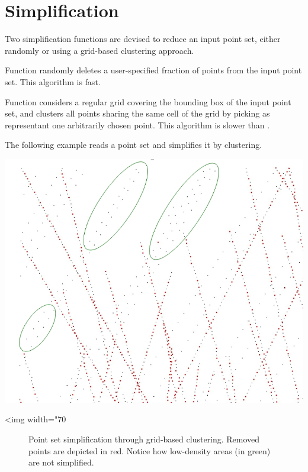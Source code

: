 \section{Simplification}

Two simplification functions are devised to reduce an input point set, either randomly or using a grid-based clustering approach.

Function  randomly deletes a user-specified fraction of points from the input point set. This algorithm is fast.

Function  considers a regular grid covering the bounding box of the input point set, and clusters all points sharing the same cell of the grid by picking as representant one arbitrarily chosen point. This algorithm is slower than .

\ccExample

The following example reads a point set and simplifies it by clustering.

\begin{center}
    \label{Point_set_processing_3-fig-grid_simplification}
    \begin{ccTexOnly}
        \includegraphics[width=1.0\textwidth]{Point_set_processing_3/grid_simplification} %
    \end{ccTexOnly}
    \begin{ccHtmlOnly}
        <img width="70%
    \end{ccHtmlOnly}
    \begin{figure}[h]
        \caption{Point set simplification through grid-based clustering.
                 Removed points are depicted in red. Notice how
                 low-density areas (in green) are not simplified.}
    \end{figure}
\end{center}



